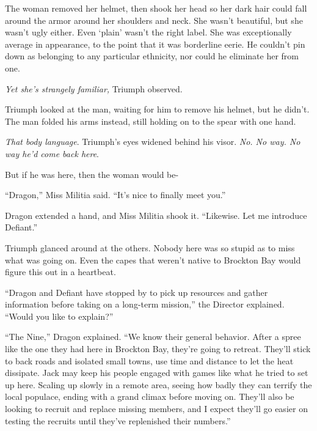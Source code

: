 The woman removed her helmet, then shook her head so her dark hair could fall around the armor around her shoulders and neck.  She wasn't beautiful, but she wasn't ugly either.  Even `plain' wasn't the right label.  She was exceptionally average in appearance, to the point that it was borderline eerie.  He couldn't pin down as belonging to any particular ethnicity, nor could he eliminate her from one.



\emph{Yet she's strangely familiar,} Triumph observed.



Triumph looked at the man, waiting for him to remove his helmet, but he didn't.  The man folded his arms instead, still holding on to the spear with one hand.



\emph{That body language}.  Triumph's eyes widened behind his visor.  \emph{No.  No way.  No way he'd come back here}.



But if he was here, then the woman would be-



``Dragon,'' Miss Militia said.  ``It's nice to finally meet you.''



Dragon extended a hand, and Miss Militia shook it.  ``Likewise.  Let me introduce Defiant.''



Triumph glanced around at the others.  Nobody here was so stupid as to miss what was going on.  Even the capes that weren't native to Brockton Bay would figure this out in a heartbeat.



``Dragon and Defiant have stopped by to pick up resources and gather information before taking on a long-term mission,'' the Director explained.  ``Would you like to explain?''



``The Nine,'' Dragon explained.  ``We know their general behavior.  After a spree like the one they had here in Brockton Bay, they're going to retreat.  They'll stick to back roads and isolated small towns, use time and distance to let the heat dissipate.  Jack may keep his people engaged with games like what he tried to set up here.  Scaling up slowly in a remote area, seeing how badly they can terrify the local populace, ending with a grand climax before moving on.  They'll also be looking to recruit and replace missing members, and I expect they'll go easier on testing the recruits until they've replenished their numbers.''



